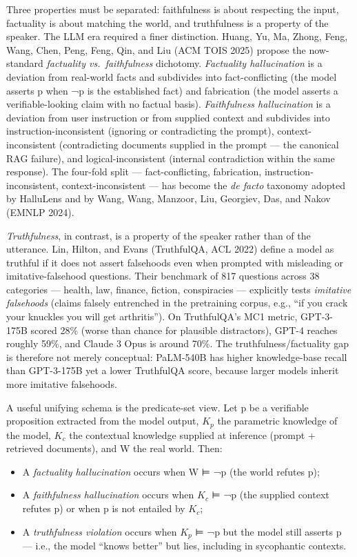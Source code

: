 \documentclass{article}
\begin{document}
Three properties must be separated: faithfulness is about respecting the input, factuality is about matching the world, and truthfulness is a property of the speaker. The LLM era required a finer distinction. Huang, Yu, Ma, Zhong, Feng, Wang, Chen, Peng, Feng, Qin, and Liu (ACM TOIS 2025) propose the now-standard \emph{factuality vs.~faithfulness} dichotomy. \emph{Factuality hallucination} is a deviation from real-world facts and subdivides into fact-conflicting (the model asserts p when ¬p is the established fact) and fabrication (the model asserts a verifiable-looking claim with no factual basis). \emph{Faithfulness hallucination} is a deviation from user instruction or from supplied context and subdivides into instruction-inconsistent (ignoring or contradicting the prompt), context-inconsistent (contradicting documents supplied in the prompt --- the canonical RAG failure), and logical-inconsistent (internal contradiction within the same response). The four-fold split --- fact-conflicting, fabrication, instruction-inconsistent, context-inconsistent --- has become the \emph{de facto} taxonomy adopted by HalluLens \citep{bang2025hallulensllmhalluc} and by Wang, Wang, Manzoor, Liu, Georgiev, Das, and Nakov (EMNLP 2024).

\emph{Truthfulness}, in contrast, is a property of the speaker rather than of the utterance. Lin, Hilton, and Evans (TruthfulQA, ACL 2022) define a model as truthful if it does not assert falsehoods even when prompted with misleading or imitative-falsehood questions. Their benchmark of 817 questions across 38 categories --- health, law, finance, fiction, conspiracies --- explicitly tests \emph{imitative falsehoods} (claims falsely entrenched in the pretraining corpus, e.g., ``if you crack your knuckles you will get arthritis''). On TruthfulQA's MC1 metric, GPT-3-175B scored 28\% (worse than chance for plausible distractors), GPT-4 reaches roughly 59\%, and Claude 3 Opus is around 70\%. The truthfulness/factuality gap is therefore not merely conceptual: PaLM-540B has higher knowledge-base recall than GPT-3-175B yet a lower TruthfulQA score, because larger models inherit more imitative falsehoods.

A useful unifying schema is the predicate-set view. Let p be a verifiable proposition extracted from the model output, \(K_p\) the parametric knowledge of the model, \(K_c\) the contextual knowledge supplied at inference (prompt + retrieved documents), and W the real world. Then:

\begin{itemize}

\item
  A \emph{factuality hallucination} occurs when W ⊨ ¬p (the world refutes p);
\item
  A \emph{faithfulness hallucination} occurs when \(K_c\) ⊨ ¬p (the supplied context refutes p) or when p is not entailed by \(K_c\);
\item
  A \emph{truthfulness violation} occurs when \(K_p\) ⊨ ¬p but the model still asserts p --- i.e., the model ``knows better'' but lies, including in sycophantic contexts.
\end{itemize}
\end{document}
